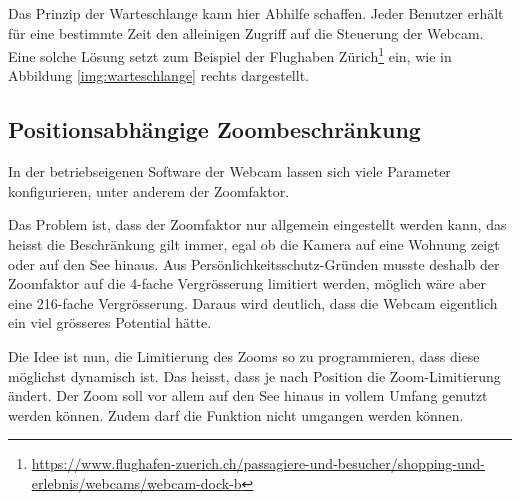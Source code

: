 \noindent
Das Prinzip der Warteschlange kann hier Abhilfe schaffen. Jeder Benutzer erhält für eine bestimmte Zeit den alleinigen Zugriff auf die Steuerung der Webcam. Eine solche Lösung setzt zum Beispiel der Flughaben Zürich\footnote{ \url{https://www.flughafen-zuerich.ch/passagiere-und-besucher/shopping-und-erlebnis/webcams/webcam-dock-b}} ein, wie in Abbildung \ref{img:warteschlange} rechts dargestellt.



\subsection{Positionsabhängige Zoombeschränkung}
In der betriebseigenen Software der Webcam lassen sich viele Parameter konfigurieren, unter anderem der Zoomfaktor. 
\newline

\noindent
Das Problem ist, dass der Zoomfaktor nur allgemein eingestellt werden kann, das heisst die Beschränkung gilt immer, egal ob die Kamera auf eine Wohnung zeigt oder auf den See hinaus. Aus Persönlichkeitsschutz-Gründen musste deshalb der Zoomfaktor auf die 4-fache Vergrösserung limitiert werden, möglich wäre aber eine 216-fache Vergrösserung. Daraus wird deutlich, dass die Webcam eigentlich ein viel grösseres Potential hätte.
\newline

\noindent
Die Idee ist nun, die Limitierung des Zooms so zu programmieren, dass diese möglichst dynamisch ist. Das heisst, dass je nach Position die Zoom-Limitierung ändert. Der Zoom soll vor allem auf den See hinaus in vollem Umfang genutzt werden können. Zudem darf die Funktion nicht umgangen werden können.



